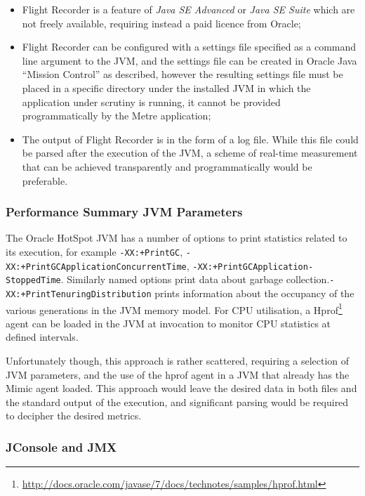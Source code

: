 \documentclass[]{final_report}
\begin{document}
\begin{itemize}
\item Flight Recorder is a feature of \textit{Java SE Advanced} or \textit{Java SE Suite} which are not freely available, requiring instead a paid licence from Oracle;
\item Flight Recorder can be configured with a settings file specified as a command line argument to the JVM, and the settings file can be created in Oracle Java “Mission Control” as described, however the resulting settings file must be placed in a specific directory under the installed JVM in which the application under scrutiny is running, it cannot be provided programmatically by the Metre application;
\item The output of Flight Recorder is in the form of a log file. While this file could be parsed after the execution of the JVM, a scheme of real-time measurement that can be achieved transparently and programmatically would be preferable.
\end{itemize}

\subsubsection{Performance Summary JVM Parameters}

The Oracle HotSpot JVM has a number of options to print statistics related to its execution, for example \lstinline{-XX:+PrintGC}, \lstinline{-XX:+PrintGCApplicationConcurrentTime}, \lstinline{-XX:+PrintGCApplication-}\linebreak[4]\lstinline{StoppedTime}. Similarly named options print data about garbage collection.\linebreak[4]\lstinline{-XX:+PrintTenuringDistribution}\noop{} prints information about the occupancy of the various generations in the JVM memory model. For CPU utilisation, a Hprof\footnote{\url{http://docs.oracle.com/javase/7/docs/technotes/samples/hprof.html}} agent can be loaded in the JVM at invocation to monitor CPU statistics at defined intervals.

Unfortunately though, this approach is rather scattered, requiring a selection of JVM parameters, and the use of the hprof agent in a JVM that already has the Mimic agent loaded. This approach would leave the desired data in both files and the standard output of the execution, and significant parsing would be required to decipher the desired metrics.

\subsubsection{JConsole and JMX}
\end{document}
